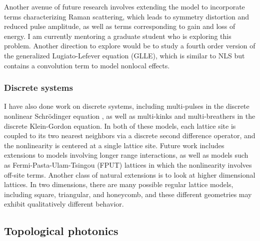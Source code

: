 \documentclass[11pt,reqno,oneside]{article}
\theoremstyle{definition}
\theoremstyle{remark}
\begin{document}
Another avenue of future research involves extending the model to incorporate terms characterizing Raman scattering, which leads to symmetry distortion and reduced pulse amplitude, as well as terms corresponding to gain and loss of energy. I am currently mentoring a graduate student who is exploring this problem. Another direction to explore would be to study a fourth order version of the generalized Lugiato-Lefever equation (GLLE), which is similar to NLS but contains a convolution term to model nonlocal effects.

\subsubsection*{Discrete systems}

I have also done work on discrete systems, including multi-pulses in the discrete nonlinear Schr\"odinger equation \cite{parker2020}, as well as multi-kinks \cite{ParkerSG} and multi-breathers \cite{Parker2022DKGbreathers} in the discrete Klein-Gordon equation. In both of these models, each lattice site is coupled to its two nearest neighbors via a discrete second difference operator, and the nonlinearity is centered at a single lattice site.
Future work includes extensions to models involving longer range interactions, as well as models such as Fermi-Pasta-Ulam-Tsingou (FPUT) lattices in which the nonlinearity involves off-site terms. Another class of natural extensions is to look at higher dimensional lattices. In two dimensions, there are many possible regular lattice models, including square, triangular, and honeycomb, and these different geometries may exhibit qualitatively different behavior. 


\subsection*{Topological photonics}
\end{document}
